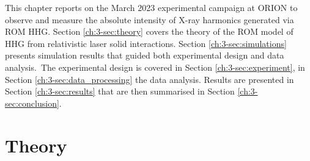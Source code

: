 This chapter reports on the March 2023 experimental campaign at ORION to observe and measure the absolute intensity of X-ray harmonics generated via ROM HHG. Section \ref{ch:3-sec:theory} covers the theory of the ROM model of HHG from relativistic laser solid interactions. Section \ref{ch:3-sec:simulations} presents simulation results that guided both experimental design and data analysis. The experimental design is covered in Section \ref{ch:3-sec:experiment}, in Section \ref{ch:3-sec:data_processing} the data analysis. Results are presented in Section \ref{ch:3-sec:results} that are then summarised in Section \ref{ch:3-sec:conclusion}. 

\section{\label{ch:3-sec:theory}Theory}
